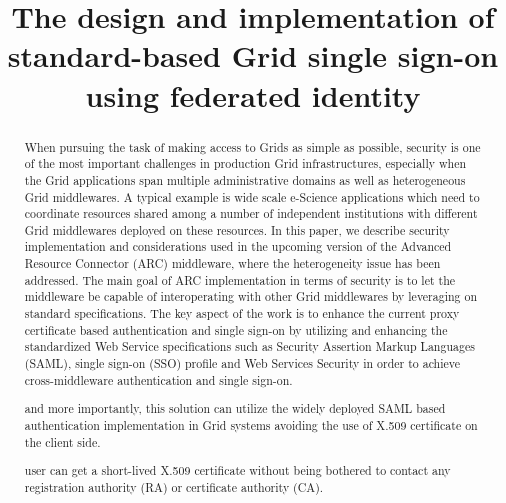 \documentclass[conference]{IEEEtran}
\begin{document}
\title{The design and implementation of standard-based Grid single sign-on using federated identity}

\author{
}

\maketitle


\begin{abstract}
When pursuing the task of making access to Grids as simple as possible, security is one of the most important challenges in production Grid infrastructures, especially when the Grid applications span multiple administrative domains as well as heterogeneous Grid middlewares. A typical example is wide scale e-Science applications which need to coordinate resources shared among a number of independent institutions with different Grid middlewares deployed on these resources. In this paper, we describe security implementation and considerations used in the upcoming version of the Advanced Resource Connector (ARC) middleware, where the heterogeneity issue has been addressed. The main goal of ARC implementation in terms of security is to let the middleware be capable of interoperating with other Grid middlewares by leveraging on standard specifications. The key aspect of the work is to enhance the current proxy certificate based authentication and single sign-on by utilizing and enhancing the standardized Web Service specifications such as Security Assertion Markup Languages (SAML), single sign-on (SSO) profile and Web Services Security in order to achieve cross-middleware authentication and single sign-on.

and more importantly, this solution can utilize the widely deployed SAML based authentication implementation in Grid systems avoiding the use of X.509 certificate on the client side.

user can get a short-lived X.509 certificate without being bothered to contact any registration authority (RA) or certificate authority (CA).

\end{abstract}

\end{document}
